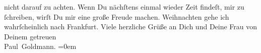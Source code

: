 \begin{ledgroupsized}[t]{13cm}
               nicht darauf zu achten.\pend
           \pstart
           Wenn Du nächſtens einmal wieder Zeit findeſt, mir zu ſchreiben, wirſt Du mir eine
               große Freude machen. Weihnachten gehe ich
               wahrſcheinlich nach {\pb}Frankfurt.\pend
           \pstart
           Viele herzliche Grüße an Dich und Deine Frau von Deinem getreuen {\\[\baselineskip]}\spacefill\mbox{Paul Goldmann.}\pend
           \leftskip=0em{}
         
         \endnumbering{}\end{ledgroupsized}\begin{anhang}\end{anhang}\newcommand{\dateiname}{L03389}\newcommand{\titel}{Paul Goldmann an Arthur Schnitzler, 13. 12. [1903]}\newcommand{\editorInnen}{Martin Anton Müller und Laura Untner}
      